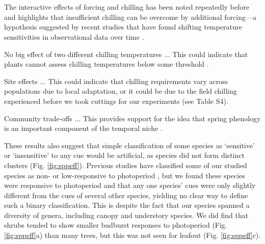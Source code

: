 \documentclass[11pt]{article}
\begin{document}
\vspace{2ex}\\
\vspace{2ex}\\

The interactive effects of forcing and chilling has been noted repeatedly before \citep[e.g.,][]{Heide:1993b,Caffarra:2011aa} and highlights that insufficient chilling can be overcome by additional forcing---a hypothesis suggested by recent studies that have found shifting temperature sensitivities in observational data over time \citep{yu2010,fu2015}. 

No big effect of two different chilling temperatures ... This could indicate that plants cannot assess chilling temperatures below some threshold \citep{coville1920,Harrington:2010,guy2014}. 

Site effects ... This could indicate that chilling requirements vary across populations due to local adaptation, or it could be due to the field chilling experienced before we took cuttings for our experiments (see Table S4). 

Community trade-offs ... This provides support for the idea that spring phenology is an important component of the temporal niche \citep{gotelli1996,Loreau:2008xy}. 

These results also suggest that simple classification of some species as `sensitive' or `insensitive' to any cue would be artificial, as species did not form distinct clusters (Fig. \ref{fig:sppeff}). Previous studies have classified some of our studied species as non- or low-responsive to photoperiod \citep[i.e., \emph{Alnus incana, Aronia melanocarpa,}][]{zohner2016ncc}, but we found these species were responsive to photoperiod and that any one species' cues were only slightly different from the cues of several other species, yielding no clear way to define such a binary classification. This is despite the fact that our species spanned a diversity of genera, including canopy and understory species. We did find that shrubs tended to show smaller budburst responses to photoperiod (Fig. \ref{fig:sppeff}a) than many trees, but this was not seen for leafout (Fig. \ref{fig:sppeff}c). 
\end{document}
